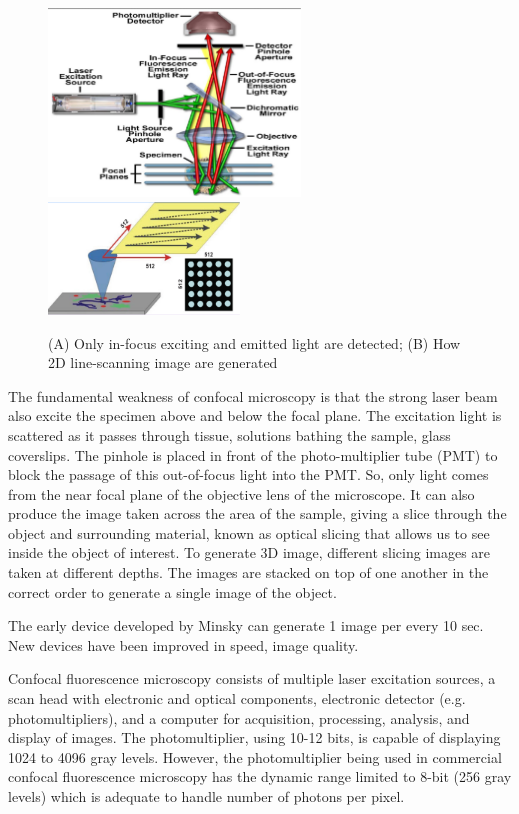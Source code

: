 \begin{figure}[hbt]
  \centerline{\includegraphics[height=5cm,
    angle=0]{./images/LSCM_infocuslight.eps} \includegraphics[height=3cm,
    angle=0]{./images/LSCM_spot2image.eps}}
  \caption{(A) Only in-focus exciting and emitted light are detected; (B) How 2D
  line-scanning image are generated}
  \label{fig:LSCM_spot2image}
\end{figure}


The fundamental weakness of confocal microscopy is that the strong laser beam
also excite the specimen above and below the focal plane. The excitation light
is scattered as it passes through tissue, solutions bathing the sample, glass
coverslips. The pinhole is placed in front of the photo-multiplier tube (PMT) to
block the passage of this out-of-focus light into the PMT. So, only light comes
from the near focal plane of the objective lens of the microscope. It can also
produce the image taken across the area of the sample, giving a slice through
the object and surrounding material, known as optical slicing that allows us to
see inside the object of interest. To generate 3D image, different slicing
images are taken at different depths. The images are stacked on top of one
another in the correct order to generate a single image of the object.

\begin{framed}
The early device developed by Minsky can generate 1 image per every 10 sec. New
devices have been improved in speed, image quality.
\end{framed}

Confocal fluorescence microscopy consists of multiple laser excitation sources,
a scan head with electronic and optical components, electronic detector (e.g.
photomultipliers), and a computer for acquisition, processing, analysis, and
display of images. The photomultiplier, using 10-12 bits, is capable of
displaying 1024 to 4096 gray levels. However, the photomultiplier being used in
commercial confocal fluorescence microscopy has the dynamic range limited to
8-bit (256 gray levels) which is adequate to handle number of photons per pixel. 

